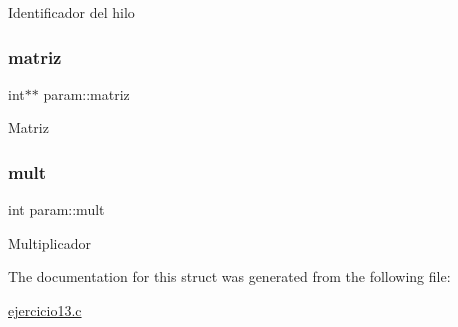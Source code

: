 Identificador del hilo \mbox{\label{structparam_af5ed705ed1a83675011b4e89d35b91a2}} 
\subsubsection{\texorpdfstring{matriz}{matriz}}
{\footnotesize\ttfamily int$\ast$$\ast$ param\+::matriz}

Matriz \mbox{\label{structparam_a6e90bf3ec4545c53ebd617b79b1f5350}} 
\subsubsection{\texorpdfstring{mult}{mult}}
{\footnotesize\ttfamily int param\+::mult}

Multiplicador 

The documentation for this struct was generated from the following file\+:\begin{DoxyCompactItemize}
\item 
\mbox{\hyperlink{ejercicio13_8c}{ejercicio13.\+c}}\end{DoxyCompactItemize}
